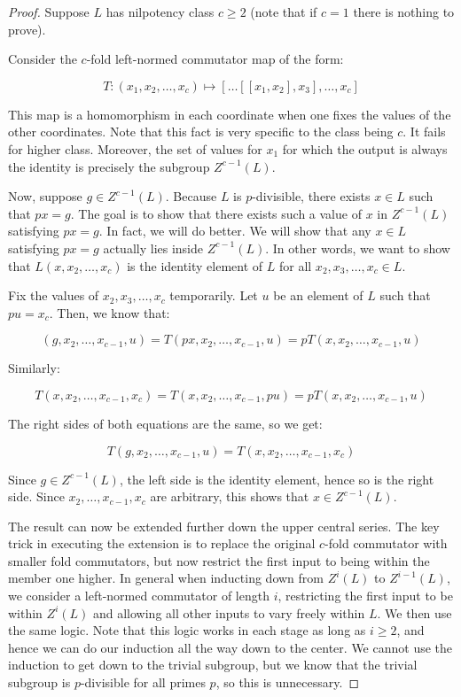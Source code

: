 \documentclass{ucetd}
\begin{document}
\begin{proof}
  Suppose $L$ has nilpotency class $c \ge 2$ (note that if $c = 1$
  there is nothing to prove).

  Consider the $c$-fold left-normed commutator map of the form:

  $$T:(x_1,x_2,\dots,x_c) \mapsto [\dots [[x_1,x_2],x_3],\dots,x_c]$$

  This map is a homomorphism in each coordinate when one fixes the
  values of the other coordinates. Note that this fact is very
  specific to the class being $c$. It fails for higher
  class. Moreover, the set of values for $x_1$ for which the output is
  always the identity is precisely the subgroup $Z^{c-1}(L)$.

  Now, suppose $g \in Z^{c-1}(L)$. Because $L$ is $p$-divisible, there
  exists $x \in L$ such that $px = g$. The goal is to show that there
  exists such a value of $x$ in $Z^{c-1}(L)$ satisfying $px = g$. In
  fact, we will do better. We will show that any $x \in L$ satisfying
  $px = g$ actually lies inside $Z^{c-1}(L)$. In other words, we want
  to show that $L(x,x_2,\dots,x_c)$ is the identity element of $L$ for
  all $x_2,x_3,\dots,x_c \in L$.

  Fix the values of $x_2,x_3,\dots,x_c$ temporarily. Let $u$ be an
  element of $L$ such that $pu = x_c$. Then, we know that:

  $$(g,x_2,\dots,x_{c-1},u) = T(px,x_2,\dots,x_{c-1},u) = pT(x,x_2,\dots,x_{c-1},u)$$

  Similarly:

  $$T(x,x_2,\dots,x_{c-1},x_c) = T(x,x_2,\dots,x_{c-1},pu) = pT(x,x_2,\dots,x_{c-1},u)$$

  The right sides of both equations are the same, so we get:

  $$T(g,x_2,\dots,x_{c-1},u) = T(x,x_2,\dots,x_{c-1},x_c)$$

  Since $g \in Z^{c-1}(L)$, the left side is the identity element,
  hence so is the right side. Since $x_2,\dots,x_{c-1},x_c$ are
  arbitrary, this shows that $x \in Z^{c-1}(L)$.

  The result can now be extended further down the upper central
  series. The key trick in executing the extension is to replace the
  original $c$-fold commutator with smaller fold commutators, but now
  restrict the first input to being within the member one higher. In
  general when inducting down from $Z^i(L)$ to $Z^{i-1}(L)$, we
  consider a left-normed commutator of length $i$, restricting the
  first input to be within $Z^i(L)$ and allowing all other inputs to
  vary freely within $L$. We then use the same logic. Note that this
  logic works in each stage as long as $i \ge 2$, and hence we can do
  our induction all the way down to the center. We cannot use the
  induction to get down to the trivial subgroup, but we know that the
  trivial subgroup is $p$-divisible for all primes $p$, so this is
  unnecessary.
\end{proof}
\end{document}
